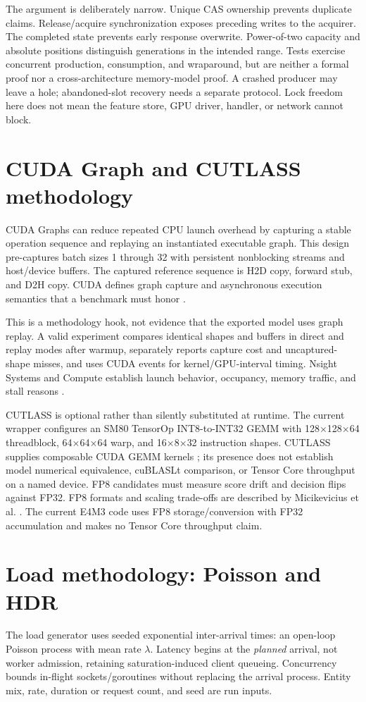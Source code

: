 \documentclass[10pt,a4paper,twocolumn]{article}
\begin{document}
The argument is deliberately narrow. Unique CAS ownership prevents duplicate
claims. Release/acquire synchronization exposes preceding writes to the acquirer.
The completed state prevents early response overwrite. Power-of-two capacity and
absolute positions distinguish generations in the intended range. Tests exercise
concurrent production, consumption, and wraparound, but are neither a formal
proof nor a cross-architecture memory-model proof. A crashed producer may leave
a hole; abandoned-slot recovery needs a separate protocol. Lock freedom here
does not mean the feature store, GPU driver, handler, or network cannot block.
\section{CUDA Graph and CUTLASS methodology}
CUDA Graphs can reduce repeated CPU launch overhead by capturing a stable
operation sequence and replaying an instantiated executable graph. This design
pre-captures batch sizes 1 through 32 with persistent nonblocking streams and
host/device buffers. The captured reference sequence is H2D copy, forward stub,
and D2H copy. CUDA defines graph capture and asynchronous execution semantics
that a benchmark must honor \cite{cudagraphs,cudaasync}.

This is a methodology hook, not evidence that the exported model uses graph
replay. A valid experiment compares identical shapes and buffers in direct and
replay modes after warmup, separately reports capture cost and uncaptured-shape
misses, and uses CUDA events for kernel/GPU-interval timing. Nsight Systems and
Compute establish launch behavior, occupancy, memory traffic, and stall reasons
\cite{nsight}.

CUTLASS is optional rather than silently substituted at runtime. The current
wrapper configures an SM80 TensorOp INT8-to-INT32 GEMM with 128$\times$128$\times$64
threadblock, 64$\times$64$\times$64 warp, and 16$\times$8$\times$32 instruction
shapes. CUTLASS supplies composable CUDA GEMM kernels \cite{cutlass}; its presence
does not establish model numerical equivalence, cuBLASLt comparison, or Tensor
Core throughput on a named device. FP8 candidates must measure score drift and
decision flips against FP32. FP8 formats and scaling trade-offs are described by
Micikevicius et al. \cite{fp8}. The current E4M3 code uses FP8
storage/conversion with FP32 accumulation and makes no Tensor Core throughput
claim.

\section{Load methodology: Poisson and HDR}
The load generator uses seeded exponential inter-arrival times: an open-loop
Poisson process with mean rate $\lambda$. Latency begins at the \emph{planned}
arrival, not worker admission, retaining saturation-induced client queueing.
Concurrency bounds in-flight sockets/goroutines without replacing the arrival
process. Entity mix, rate, duration or request count, and seed are run inputs.
\end{document}

